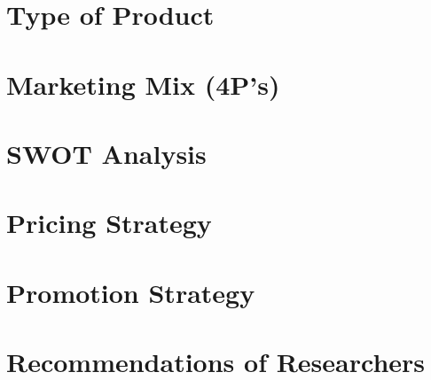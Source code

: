 \documentclass[a4paper,12pt]{article}
\begin{document}
\section{Type of Product}

\newpage

\section{Marketing Mix (4P's)}

\newpage

\section{SWOT Analysis}

\newpage

\section{Pricing Strategy}

\newpage

\section{Promotion Strategy}

\newpage

\section{Recommendations of Researchers}

\end{document}
